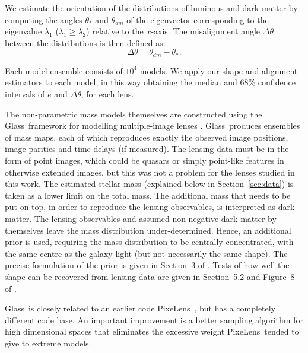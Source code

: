 \documentclass[useAMS,usenatbib]{mn2e}
\def\Glass{{\sc Glass}}
\def\PixeLens{{\sc PixeLens}}
\begin{document}
We estimate the orientation of the distributions of luminous and dark matter by computing the angles $\theta_{*}$ and $\theta_{dm}$ of the eigenvector corresponding to the eigenvalue $\lambda_{1}$ ($\lambda_{1} \geq \lambda_{2}$) relative to the $x$-axis. The misalignment angle $\Delta\theta$ between the distributions is then defined as:
\begin{equation}\label{eq:misalignment}
  \Delta\theta = \theta_{dm} - \theta_{*}.
\end{equation}

Each model ensemble consists of $10^4$ models. We apply our shape and alignment estimators to each model, in this way obtaining the median and 68\% confidence intervals of $e$ and $\Delta \theta$, for each lens.

The non-parametric mass models themselves are constructed using the \Glass\ framework for modelling multiple-image lenses \citep{2014MNRAS.445.2181C}. \Glass\ produces ensembles of mass maps, each of which reproduces exactly the observed image positions, image parities and time delays (if measured). The lensing data must be in the form of point images, which could be quasars or simply point-like features in otherwise extended images, but this was not a problem for the lenses studied in this work. The estimated stellar mass (explained below in Section~\ref{sec:data}) is taken as a lower limit on the total mass. The additional mass that needs to be put on top, in order to reproduce the lensing observables, is interpreted as dark matter. The lensing observables and assumed non-negative dark matter by themselves leave the mass distribution under-determined. Hence, an additional prior is used, requiring the mass distribution to be centrally concentrated, with the same centre as the galaxy light (but not necessarily the same shape). The precise formulation of the prior is given in Section~3 of \citet{2014MNRAS.445.2181C} \citep[alternatively, for a more intuitive account of \Glass\ see Section~3.2 of][]{2015MNRAS.447.2170K}. Tests of how well the shape can be recovered from lensing data are given in Section~5.2 and Figure~8 of \citet{2014MNRAS.445.2181C}.

\Glass\ is closely related to an earlier code \PixeLens\ \citep{2004AJ....127.2604S,2008ApJ...679...17C}, but has a completely different code base. An important improvement is a better sampling algorithm for high dimensional spaces \citep{2012MNRAS.425.3077L} that eliminates the excessive weight \PixeLens\ tended to give to extreme models.
\end{document}
